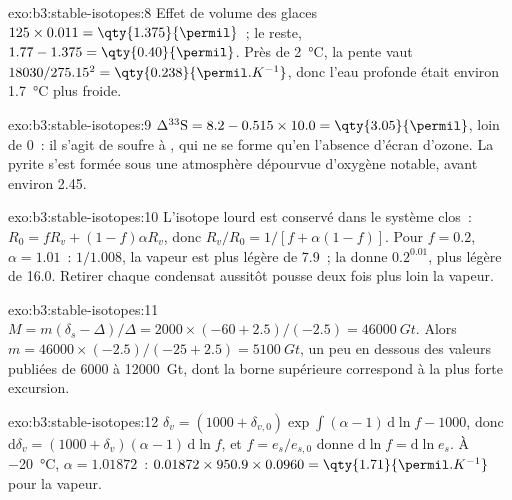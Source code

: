 \begin{solution}{exo:b3:stable-isotopes:8}
Effet de volume des glaces $125\times0.011 = \qty{1.375}{\permil}$~; le reste, $1.77 - 1.375 =
\qty{0.40}{\permil}$. Près de \qty{2}{\celsius}, la pente vaut $18030/275.15^2 =
\qty{0.238}{\permil.K^{-1}}$, donc l'eau profonde était environ \qty{1.7}{\celsius}
plus froide.
\end{solution}

\begin{solution}{exo:b3:stable-isotopes:9}
$\Delta^{33}\mathrm S = 8.2 - 0.515\times10.0 = \qty{3.05}{\permil}$, loin de 0~:
il s'agit de soufre à , qui ne se forme qu'en l'absence d'écran d'ozone. La pyrite
s'est formée sous une atmosphère dépourvue d'oxygène notable, avant environ
\qty{2.45}{\Ga}.
\end{solution}

\begin{solution}{exo:b3:stable-isotopes:10}
L'isotope lourd est conservé dans le système clos~: $R_0 = fR_v + (1 -
f)\alpha R_v$, donc $R_v/R_0 = 1/[f + \alpha(1 - f)]$. Pour $f = 0.2$, $\alpha =
1.01$~: $1/1.008$, la vapeur est plus légère de \qty{7.9}{\permil}~; la  donne
$0.2^{0.01}$, plus légère de \qty{16.0}{\permil}. Retirer chaque condensat aussitôt
pousse deux fois plus loin la vapeur.
\end{solution}

\begin{solution}{exo:b3:stable-isotopes:11}
$M = m(\delta_s - \Delta)/\Delta = 2000\times(-60 + 2.5)/(-2.5) = \qty{46000}{Gt}$.
Alors $m = 46000\times(-2.5)/(-25 + 2.5) = \qty{5100}{Gt}$, un peu en dessous des
valeurs publiées de 6000 à \qty{12000}{Gt}, dont la borne supérieure correspond à la
plus forte excursion.
\end{solution}

\begin{solution}{exo:b3:stable-isotopes:12}
$\delta_v = (1000 + \delta_{v,0})\exp\int(\alpha - 1)\,\mathrm d\ln f - 1000$, donc
$\mathrm d\delta_v = (1000 + \delta_v)(\alpha - 1)\,\mathrm d\ln f$, et $f =
e_s/e_{s,0}$ donne $\mathrm d\ln f = \mathrm d\ln e_s$. À \qty{-20}{\celsius},
$\alpha = 1.01872$~: $0.01872\times950.9\times0.0960 =
\qty{1.71}{\permil.K^{-1}}$ pour la vapeur.
\end{solution}

